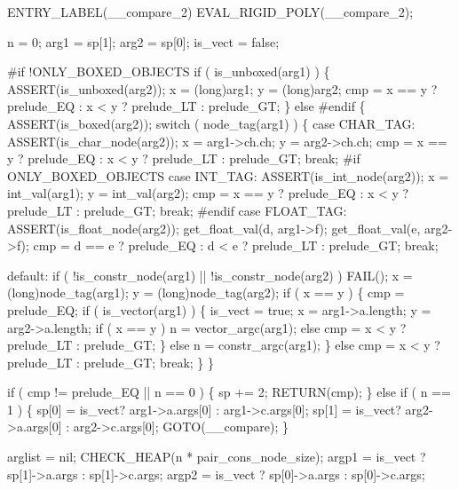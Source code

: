  ENTRY_LABEL(__compare_2)
    EVAL_RIGID_POLY(__compare_2);

    n       = 0;
    arg1    = sp[1];
    arg2    = sp[0];
    is_vect = false;

#if !ONLY_BOXED_OBJECTS
    if ( is_unboxed(arg1) )
    \{
        ASSERT(is_unboxed(arg2));
        x = (long)arg1;
        y = (long)arg2;
        cmp = x == y ? prelude_EQ : x < y ? prelude_LT : prelude_GT;
    \}
    else
#endif
    \{
        ASSERT(is_boxed(arg2));
        switch ( node_tag(arg1) )
        \{
        case CHAR_TAG:
            ASSERT(is_char_node(arg2));
            x = arg1->ch.ch;
            y = arg2->ch.ch;
            cmp = x == y ? prelude_EQ : x < y ? prelude_LT : prelude_GT;
            break;
#if ONLY_BOXED_OBJECTS
        case INT_TAG:
            ASSERT(is_int_node(arg2));
            x = int_val(arg1);
            y = int_val(arg2);
            cmp = x == y ? prelude_EQ : x < y ? prelude_LT : prelude_GT;
            break;
#endif
        case FLOAT_TAG:
            ASSERT(is_float_node(arg2));
            get_float_val(d, arg1->f);
            get_float_val(e, arg2->f);
            cmp = d == e ? prelude_EQ : d < e ? prelude_LT : prelude_GT;
            break;

        default:
            if ( !is_constr_node(arg1) || !is_constr_node(arg2) )
                FAIL();
            x = (long)node_tag(arg1);
            y = (long)node_tag(arg2);
            if ( x == y )
            \{
                cmp = prelude_EQ;
                if ( is_vector(arg1) )
                \{
                    is_vect = true;
                    x = arg1->a.length;
                    y = arg2->a.length;
                    if ( x == y )
                        n = vector_argc(arg1);
                    else
                        cmp = x < y ? prelude_LT : prelude_GT;
                \}
                else
                    n = constr_argc(arg1);
            \}
            else
                cmp = x < y ? prelude_LT : prelude_GT;
            break;
        \}
    \}

    if ( cmp != prelude_EQ || n == 0 )
    \{
        sp += 2;
        RETURN(cmp);
    \}
    else if ( n == 1 )
    \{
        sp[0] = is_vect? arg1->a.args[0] : arg1->c.args[0];
        sp[1] = is_vect? arg2->a.args[0] : arg2->c.args[0];
        GOTO(__compare);
    \}

    arglist = nil;
    CHECK_HEAP(n * pair_cons_node_size);
    argp1 = is_vect ? sp[1]->a.args : sp[1]->c.args;
    argp2 = is_vect ? sp[0]->a.args : sp[0]->c.args;

